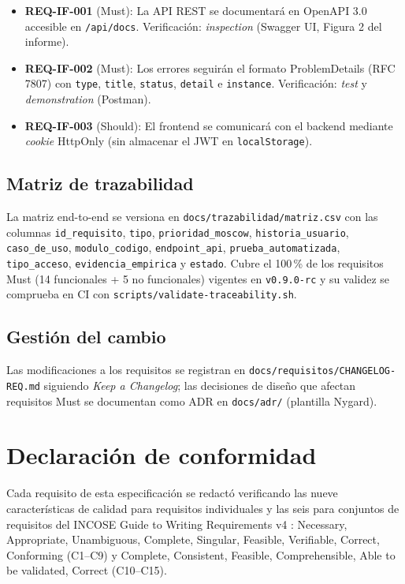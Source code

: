 \documentclass[12pt,a4paper]{article}
\begin{document}
\begin{itemize}
  \item \textbf{REQ-IF-001} (Must): La API REST se documentará en OpenAPI 3.0 accesible en
  \texttt{/api/docs}. Verificación: \textit{inspection} (Swagger UI, Figura 2 del informe).
  \item \textbf{REQ-IF-002} (Must): Los errores seguirán el formato ProblemDetails (RFC 7807)
  con \texttt{type}, \texttt{title}, \texttt{status}, \texttt{detail} e \texttt{instance}.
  Verificación: \textit{test} y \textit{demonstration} (Postman).
  \item \textbf{REQ-IF-003} (Should): El frontend se comunicará con el backend mediante
  \textit{cookie} HttpOnly (sin almacenar el JWT en \texttt{localStorage}).
\end{itemize}

\subsection{Matriz de trazabilidad}
\label{sec:matriz}

La matriz end-to-end se versiona en \texttt{docs/trazabilidad/matriz.csv} con las columnas
\texttt{id\_requisito}, \texttt{tipo}, \texttt{prioridad\_moscow},
\texttt{historia\_usuario}, \texttt{caso\_de\_uso}, \texttt{modulo\_codigo},
\texttt{endpoint\_api}, \texttt{prueba\_automatizada}, \texttt{tipo\_acceso},
\texttt{evidencia\_empirica} y \texttt{estado}. Cubre el 100\,\% de los requisitos Must
(14 funcionales + 5 no funcionales) vigentes en \texttt{v0.9.0-rc} y su validez se comprueba
en CI con \texttt{scripts/validate-traceability.sh}.

\subsection{Gestión del cambio}
\label{sec:gestion}

Las modificaciones a los requisitos se registran en \texttt{docs/requisitos/CHANGELOG-REQ.md}
siguiendo \textit{Keep a Changelog}; las decisiones de diseño que afectan requisitos Must se
documentan como ADR en \texttt{docs/adr/} (plantilla Nygard).

\section*{Declaración de conformidad}

Cada requisito de esta especificación se redactó verificando las nueve características de
calidad para requisitos individuales y las seis para conjuntos de requisitos del INCOSE Guide
to Writing Requirements v4 \cite{incose}: Necessary, Appropriate, Unambiguous, Complete,
Singular, Feasible, Verifiable, Correct, Conforming (C1–C9) y Complete, Consistent, Feasible,
Comprehensible, Able to be validated, Correct (C10–C15).

\newpage
\printbibliography[title={Referencias}]
\end{document}

